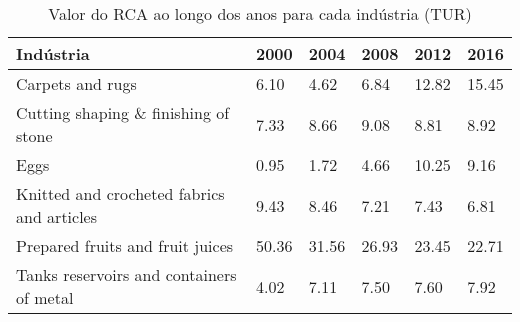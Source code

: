 \begin{table}
\centering
\caption{Valor do RCA ao longo dos anos para cada indústria (TUR)}
\label{tab:ex3-tempo-TUR}
\begin{tabular}{p{6cm}p{1.5cm}p{1.5cm}p{1.5cm}p{1.5cm}p{1.5cm}}
\toprule
                                 Indústria &  2000 &  2004 &  2008 &  2012 &  2016 \\
\midrule
                          Carpets and rugs &  6.10 &  4.62 &  6.84 & 12.82 & 15.45 \\
      Cutting shaping \& finishing of stone &  7.33 &  8.66 &  9.08 &  8.81 &  8.92 \\
                                      Eggs &  0.95 &  1.72 &  4.66 & 10.25 &  9.16 \\
Knitted and crocheted fabrics and articles &  9.43 &  8.46 &  7.21 &  7.43 &  6.81 \\
          Prepared fruits and fruit juices & 50.36 & 31.56 & 26.93 & 23.45 & 22.71 \\
  Tanks reservoirs and containers of metal &  4.02 &  7.11 &  7.50 &  7.60 &  7.92 \\
\bottomrule
\end{tabular}
\end{table}
